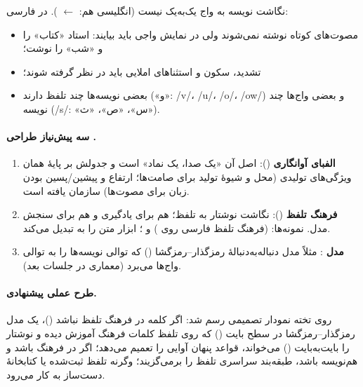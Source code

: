 نگاشت نویسه به واج یک‌به‌یک نیست (انگلیسی هم:  $\leftarrow$ ). در فارسی:
\begin{itemize}
  \item مصوت‌های کوتاه نوشته نمی‌شوند ولی در نمایش واجی باید بیایند: استاد «کتاب» را  و «شب» را  نوشت؛
  \item تشدید، سکون و استثناهای املایی باید در نظر گرفته شوند؛
  \item بعضی نویسه‌ها چند تلفظ دارند («و»: /v/، /u/، /o/، /ow/) و بعضی واج‌ها چند نویسه (/s/: «س»، «ص»، «ث»).
\end{itemize}

\paragraph{سه پیش‌نیاز طراحی .}
\begin{enumerate}
  \item \textbf{الفبای آوانگاری} (): اصل آن «یک صدا، یک نماد» است و جدولش بر پایهٔ همان ویژگی‌های تولیدی (محل و شیوهٔ تولید برای صامت‌ها؛ ارتفاع و پیشین/پسین بودن زبان برای مصوت‌ها) سازمان یافته است.
  \item \textbf{فرهنگ تلفظ} (): نگاشت نوشتار به تلفظ؛ هم برای یادگیری و هم برای سنجش مدل. نمونه‌ها:  (فرهنگ تلفظ فارسی روی ) و ؛ ابزار  متن را به  تبدیل می‌کند.
  \item \textbf{مدل }: مثلاً مدل دنباله‌به‌دنبالهٔ رمزگذار–رمزگشا () که توالی نویسه‌ها را به توالی واج‌ها می‌برد (معماری در جلسات بعد).
\end{enumerate}

\paragraph{طرح عملی پیشنهادی.} روی تخته نمودار تصمیمی رسم شد: اگر کلمه در فرهنگ تلفظ نباشد ()، یک مدل رمزگذار–رمزگشا در سطح بایت () که روی تلفظ کلمات فرهنگ آموزش دیده و نوشتار را بایت‌به‌بایت () می‌خواند، قواعد پنهان آوایی را تعمیم می‌دهد؛ اگر در فرهنگ باشد و هم‌نویسه باشد، طبقه‌بند سراسری تلفظ را برمی‌گزیند؛ وگرنه تلفظ ثبت‌شده یا کتابخانهٔ دست‌ساز به کار می‌رود.

